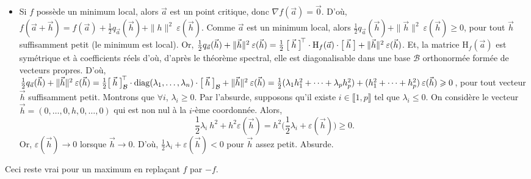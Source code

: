 \begin{prv}
	\begin{itemize}
		\item Si $f$ possède un minimum local, alors $\vec{a}$ est un point critique, donc $\nabla f(\vec{a}) = \vec{0}$.
			D'où, $f(\vec{a} + \vec{h}) = f(\vec{a}) + \frac{1}{2}q_{\vec{a}}(\vec{h}) + \|h\|^2 \:\varepsilon(\vec{h})$.
			Comme $\vec{a}$ est un minimum local, alors $\frac{1}{2}q_{\vec{a}}(\vec{h}) + \|\vec{h}\|^2 \:\varepsilon(\vec{h}) \ge 0$, pour tout $\vec{h}$ suffisamment petit (le minimum est local).
			Or, $\frac{1}{2}q_{\vec{a}}(\vec{h}) + \|\vec{h}\|^2 \:\varepsilon(\vec{h}) = \frac{1}{2}\:\big[\:\vec{h}\:\big]^{\!\!\,\top} \cdot \mathrm{H}_f(\vec{a}) \cdot \big[\:\vec{h}\:\big] + \|\vec{h}\|^2\:\varepsilon(\vec{h})$.
			Et, la matrice $\mathrm{H}_f(\vec{a})$ est symétrique et à coefficients réels d'où, d'après le théorème spectral, elle est diagonalisable dans une base $\mathcal{B}$ orthonormée formée de vecteurs propres.
			D'où, $\frac{1}{2}q_{\vec{a}}(\vec{h}) + \|\vec{h}\|^2 \:\varepsilon(\vec{h}) = \frac{1}{2} \big[\:\vec{h}\:\big]_\mathcal{B}^{\!\!\,\top} \cdot \mathrm{diag}(\lambda_1, \ldots, \lambda_n) \cdot  \big[\:\vec{h}\:\big]_\mathcal{B} + \|\vec{h}\|^2\:\varepsilon(\vec{h}) = \frac{1}{2} (\lambda_1 h_1^2 + \cdots + \lambda_p h_p^2) + (h_1^2 +\cdots + h_p^2) \:\varepsilon(\vec{h}) \geqslant 0$, pour tout vecteur $\vec{h}$ suffisamment petit.
			Montrons que $\forall i$, $\lambda_i \ge 0$.
			Par l'absurde, supposons qu'il existe $i \in \llbracket 1,p \rrbracket$ tel que $\lambda_i \le 0$.
			On considère le vecteur $\vec{h} = (0, \ldots, 0, h, 0, \ldots, 0)$ qui est non nul à la $i$-ème coordonnée.
			Alors, \[
				\frac{1}{2} \lambda_i\:h^2 + h^2 \varepsilon(\vec{h}) = h^2 \big(\frac{1}{2} \lambda_i + \varepsilon(\vec{h})\big) \ge 0
			.\] Or, $\varepsilon(\vec{h}) \to 0$ lorsque $\vec{h} \to 0$.
			D'où, $\frac{1}{2}\lambda_i + \varepsilon(\vec{h}) < 0$ pour $\vec{h}$ assez petit.
			Absurde.
	\end{itemize}
\end{prv}

Ceci reste vrai pour un maximum en replaçant $f$ par $-f$.

